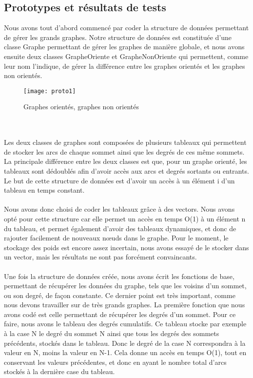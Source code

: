 \begin{titlepage}

\newpage
\begin{center}
\begin{bf}
\section{Prototypes et résultats de tests}
\end{bf}
\end{center}

\vspace{1cm}
{
Nous avons tout d'abord commencé par coder la structure de données permettant de gérer les grands graphes. Notre structure de données est constituée d'une classe Graphe permettant de gérer les graphes de manière globale, et nous avons ensuite deux classes GrapheOriente et GrapheNonOriente qui permettent, comme leur nom l'indique, de gérer la différence entre les graphes orientés et les graphes non orientés.
\begin{figure}[h]
\centering
\texttt{[image: proto1]}
\caption{Graphes orientés, graphes non orientés}
\end{figure}
~\\ \\
	Les deux classes de graphes sont composées de plusieurs tableaux qui permettent de stocker les arcs de chaque sommet ainsi que les degrés de ces même sommets. La principale différence entre les deux classes est que, pour un graphe orienté, les tableaux sont dédoublés afin d'avoir accès aux arcs et degrés sortants ou entrants. Le but de cette structure de données est d'avoir un accès à un élément i d'un tableau en temps constant. \\  \\ Nous avons donc choisi de coder les tableaux grâce à des vectors. Nous avons opté pour cette structure car elle permet un accès en temps O(1) à un élément n du tableau, et permet également d'avoir des tableaux dynamiques, et donc de rajouter facilement de nouveaux nœuds dans le graphe. Pour le moment, le stockage des poids est encore assez incertain, nous avons essayé de le stocker dans un vector, mais les résultats ne sont pas forcément convaincants.
~\\ \\
	Une fois la structure de données créée, nous avons écrit les fonctions de base, permettant de récupérer les données du graphe, tels que les voisins d'un sommet, ou son degré, de façon constante. Ce dernier point est très important, comme nous devons travailler sur de très grands graphes. La première fonction que nous avons codé est celle permettant de récupérer les degrés d'un sommet. Pour ce faire, nous avons le tableau des degrés cumulatifs. Ce tableau stocke par exemple à la case N le degré du sommet N ainsi que tous les degrés des sommets précédents, stockés dans le tableau. Donc le degré de la case N correspondra à la valeur en N, moins la valeur en N-1. Cela donne un accès en temps O(1), tout en conservant les valeurs précédentes, et donc en ayant le nombre total d'arcs stockés à la dernière case du tableau.
}
\end{titlepage}
